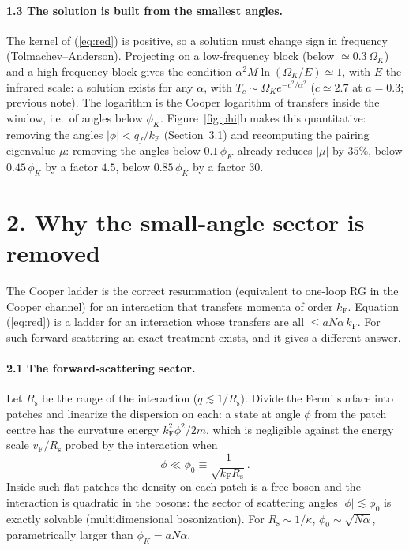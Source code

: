 \documentclass[11pt]{article}
\newcommand{\kF}{k_{\mathrm F}}
\newcommand{\vF}{v_{\mathrm F}}
\newcommand{\OK}{\Omega_K}
\newcommand{\Rs}{R_{\mathrm s}}
\begin{document}
\paragraph{1.3 The solution is built from the smallest angles.}
The kernel of (\ref{eq:red}) is positive, so a solution must change sign in frequency
(Tolmachev--Anderson). Projecting on a low-frequency block (below $\simeq0.3\,\OK$) and a
high-frequency block gives the condition $\alpha^2M\ln(\OK/E)\simeq1$, with $E$ the
infrared scale: a solution exists for any $\alpha$, with $T_c\sim\OK e^{-c^2/\alpha^2}$
($c\simeq2.7$ at $a=0.3$; previous note). The logarithm is the Cooper logarithm of transfers
inside the window, i.e.\ of angles below $\phi_K$. Figure~\ref{fig:phi}b makes this
quantitative: removing the angles $|\phi|<q_f/\kF$ (Section~3.1) and recomputing the pairing
eigenvalue $\mu$: removing the angles below $0.1\,\phi_K$ already reduces $|\mu|$ by $35\%$,
below $0.45\,\phi_K$ by a factor $4.5$, below $0.85\,\phi_K$ by a factor $30$.

\section*{2. Why the small-angle sector is removed}

The Cooper ladder is the correct resummation (equivalent to one-loop RG in the Cooper
channel) for an interaction that transfers momenta of order $\kF$. Equation (\ref{eq:red}) is
a ladder for an interaction whose transfers are all $\le aN\alpha\,\kF$. For such forward
scattering an exact treatment exists, and it gives a different answer.

\paragraph{2.1 The forward-scattering sector.}
Let $\Rs$ be the range of the interaction ($q\lesssim1/\Rs$). Divide the Fermi surface into
patches and linearize the dispersion on each: a state at angle $\phi$ from the patch centre
has the curvature energy $\kF^2\phi^2/2m$, which is negligible against the energy scale
$\vF/\Rs$ probed by the interaction when
\begin{equation}
\phi\ll\phi_0\equiv\frac{1}{\sqrt{\kF\Rs}} .
\label{eq:phi0}
\end{equation}
Inside such flat patches the density on each patch is a free boson and the interaction is
quadratic in the bosons: the sector of scattering angles $|\phi|\lesssim\phi_0$ is exactly
solvable (multidimensional bosonization). For $\Rs\sim1/\kappa$,
$\phi_0\sim\sqrt{N\alpha}$, parametrically larger than $\phi_K=aN\alpha$.
\end{document}

